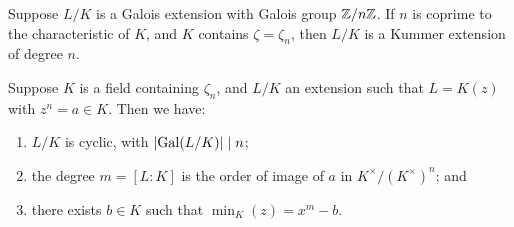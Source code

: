 \begin{definition}
    Suppose \(L/K\) is a Galois extension with Galois group \(\mathbb{Z}/n\mathbb{Z}\).
    If \(n\) is coprime to the characteristic of \(K\),
    and \(K\) contains \(\zeta = \zeta_n\),
    then \(L/K\) is a Kummer extension of degree \(n\).
\end{definition}
\begin{proposition}
    Suppose \(K\) is a field containing \(\zeta_n\),
    and \(L/K\) an extension such that \(L = K(z)\) with \(z^n = a \in K\).
    Then we have:
    \begin{enumerate}[label={(\alph*)}, itemsep=0mm]
        \item \(L/K\) is cyclic, with \(\abs{\operatorname{Gal}(L/K)} \mid n\);
        \item the degree \(m = [L:K]\) is the order of image of \(a\) in \(K^\times/{(K^\times)}^n\); and
        \item there exists \(b \in K\) such that \(\min_K(z) = x^m - b\).
    \end{enumerate}
\end{proposition}
